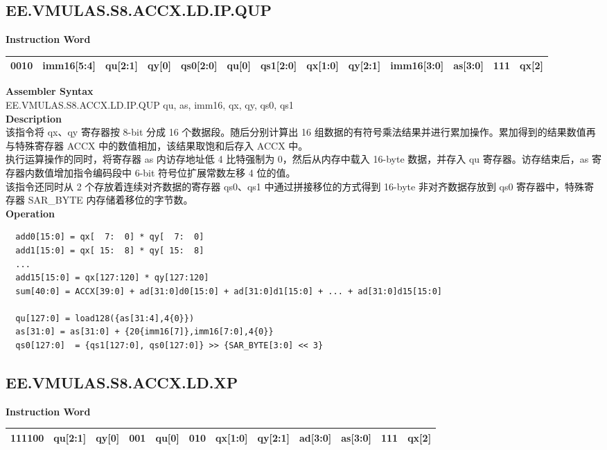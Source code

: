 \clearpage
\subsection{EE.VMULAS.S8.ACCX.LD.IP.QUP}\label{instruction:EEVMULASS8ACCXLDIPQUP}
\setlength\tabcolsep{5pt}
\textbf{Instruction Word} \\
\begin{tabular}{|c|c|c|c|c|c|c|c|c|c|c|c|c|}
	\hline
	0010 & imm16[5:4] & qu[2:1] & qy[0] & qs0[2:0] & qu[0] & qs1[2:0] & qx[1:0] & qy[2:1] & imm16[3:0] & as[3:0] & 111 & qx[2] \\
	\hline
\end{tabular}

\textbf{Assembler Syntax} \\
EE.VMULAS.S8.ACCX.LD.IP.QUP qu, as, imm16, qx, qy, qs0, qs1 \\
\textbf{Description} \\
该指令将 qx、qy 寄存器按 8-bit 分成 16 个数据段。随后分别计算出 16 组数据的有符号乘法结果并进行累加操作。累加得到的结果数值再与特殊寄存器 ACCX 中的数值相加，该结果取饱和后存入 ACCX 中。\\
执行运算操作的同时，将寄存器 as 内访存地址低 4 比特强制为 0，然后从内存中载入 16-byte 数据，并存入 qu 寄存器。访存结束后，as 寄存器内数值增加指令编码段中 6-bit 符号位扩展常数左移 4 位的值。\\
该指令还同时从 2 个存放着连续对齐数据的寄存器 qs0、qs1 中通过拼接移位的方式得到 16-byte 非对齐数据存放到 qs0 寄存器中，特殊寄存器 SAR\_BYTE 内存储着移位的字节数。\\
\textbf{Operation}
\begin{lstlisting}
  add0[15:0] = qx[  7:  0] * qy[  7:  0]
  add1[15:0] = qx[ 15:  8] * qy[ 15:  8]
  ...
  add15[15:0] = qx[127:120] * qy[127:120]
  sum[40:0] = ACCX[39:0] + ad[31:0]d0[15:0] + ad[31:0]d1[15:0] + ... + ad[31:0]d15[15:0]

  qu[127:0] = load128({as[31:4],4{0}})
  as[31:0] = as[31:0] + {20{imm16[7]},imm16[7:0],4{0}}
  qs0[127:0]  = {qs1[127:0], qs0[127:0]} >> {SAR_BYTE[3:0] << 3}
\end{lstlisting}

\clearpage
\subsection{EE.VMULAS.S8.ACCX.LD.XP}\label{instruction:EEVMULASS8ACCXLDXP}
\setlength\tabcolsep{6pt}
\textbf{Instruction Word} \\
\begin{tabular}{|c|c|c|c|c|c|c|c|c|c|c|c|}
	\hline
	111100 & qu[2:1] & qy[0] & 001 & qu[0] & 010 & qx[1:0] & qy[2:1] & ad[3:0] & as[3:0] & 111 & qx[2] \\
	\hline
\end{tabular}

